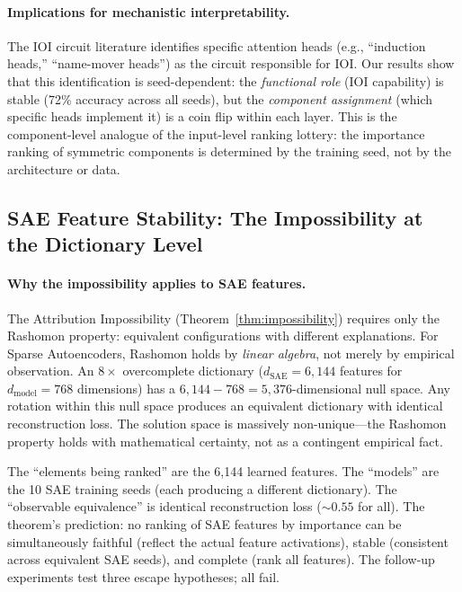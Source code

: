 \documentclass{article}
\begin{document}
\paragraph{Implications for mechanistic interpretability.}
The IOI circuit literature identifies specific attention heads (e.g., ``induction heads,'' ``name-mover heads'') as the circuit responsible for IOI. Our results show that this identification is seed-dependent: the \emph{functional role} (IOI capability) is stable (72\% accuracy across all seeds), but the \emph{component assignment} (which specific heads implement it) is a coin flip within each layer. This is the component-level analogue of the input-level ranking lottery: the importance ranking of symmetric components is determined by the training seed, not by the architecture or data.

\subsection{SAE Feature Stability: The Impossibility at the Dictionary Level}
\label{sec:sae-stability}

\paragraph{Why the impossibility applies to SAE features.}
The Attribution Impossibility (Theorem~\ref{thm:impossibility}) requires only the Rashomon property: equivalent configurations with different explanations. For Sparse Autoencoders, Rashomon holds by \emph{linear algebra}, not merely by empirical observation. An $8\times$ overcomplete dictionary ($d_{\text{SAE}} = 6{,}144$ features for $d_{\text{model}} = 768$ dimensions) has a $6{,}144 - 768 = 5{,}376$-dimensional null space. Any rotation within this null space produces an equivalent dictionary with identical reconstruction loss. The solution space is massively non-unique---the Rashomon property holds with mathematical certainty, not as a contingent empirical fact.

The ``elements being ranked'' are the 6{,}144 learned features. The ``models'' are the 10 SAE training seeds (each producing a different dictionary). The ``observable equivalence'' is identical reconstruction loss (${\sim}0.55$ for all). The theorem's prediction: no ranking of SAE features by importance can be simultaneously faithful (reflect the actual feature activations), stable (consistent across equivalent SAE seeds), and complete (rank all features). The follow-up experiments test three escape hypotheses; all fail.
\end{document}
